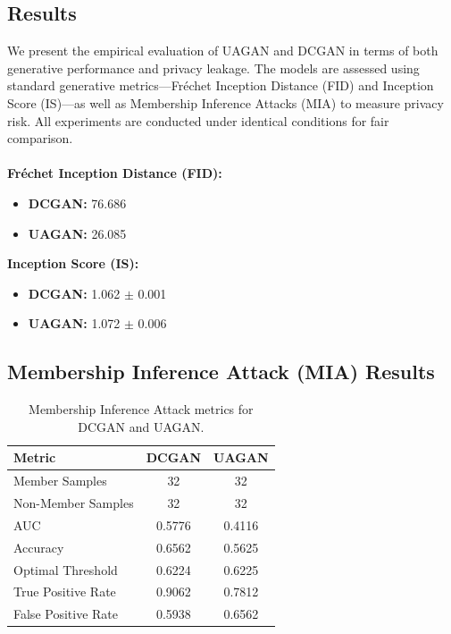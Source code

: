 \documentclass{article}
\begin{document}
\subsection{Results}
We present the empirical evaluation of UAGAN and DCGAN in terms of both generative performance and privacy leakage. The models are assessed using standard generative metrics—Fréchet Inception Distance (FID) and Inception Score (IS)—as well as Membership Inference Attacks (MIA) to measure privacy risk. All experiments are conducted under identical conditions for fair comparison.\\
\\
\textbf{Fréchet Inception Distance (FID):}
\begin{itemize}
    \item \textbf{DCGAN:} 76.686
    \item \textbf{UAGAN:} 26.085
\end{itemize}

\textbf{Inception Score (IS):}
\begin{itemize}
    \item \textbf{DCGAN:} 1.062 $\pm$ 0.001
    \item \textbf{UAGAN:} 1.072 $\pm$ 0.006
\end{itemize}

\subsection{Membership Inference Attack (MIA) Results}

\begin{table}[h]
\centering
\begin{tabular}{|l|c|c|}
\hline
\textbf{Metric} & \textbf{DCGAN} & \textbf{UAGAN} \\
\hline
Member Samples        & 32     & 32     \\
Non-Member Samples    & 32     & 32     \\
AUC                   & 0.5776 & 0.4116 \\
Accuracy              & 0.6562 & 0.5625 \\
Optimal Threshold     & 0.6224 & 0.6225 \\
True Positive Rate    & 0.9062 & 0.7812 \\
False Positive Rate   & 0.5938 & 0.6562 \\
\hline
\end{tabular}
\vspace{0.9em}
\caption{Membership Inference Attack metrics for DCGAN and UAGAN.}
\label{tab:mia_results}
\end{table}
\end{document}
